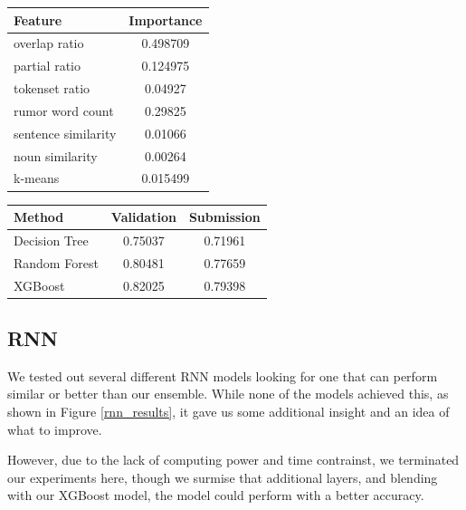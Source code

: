 \documentclass[a4paper, 12pt]{article}
\begin{document}
\begin{multicols}{2}
            \begin{center}
                \begin{tabular}{l|c}
                    Feature & Importance\\
                    \hline
                    overlap ratio & 0.498709 \\
                    partial ratio & 0.124975 \\
                    tokenset ratio & 0.04927 \\
                    rumor word count & 0.29825 \\
                    sentence similarity & 0.01066 \\
                    noun similarity & 0.00264 \\
                    k-means & 0.015499
                \end{tabular}
                \label{importance}
            \end{center}

            \begin{center}
                \begin{tabular}{l|cc}
                    Method & Validation & Submission\\
                    \hline
                    Decision Tree & 0.75037 & 0.71961 \\
                    Random Forest & 0.80481 & 0.77659 \\
                    XGBoost & 0.82025 & 0.79398 \\
                \end{tabular}
                \label{ensemb_results}
            \end{center}

        \subsection{RNN}
            We tested out several different RNN models looking for one that can perform similar or better than our ensemble. While none of the models achieved this, as shown in Figure \ref{rnn_results}, it gave us some additional insight and an idea of what to improve. 
            
            However, due to the lack of computing power and time contrainst, we terminated our experiments here, though we surmise that additional layers, and blending with our XGBoost model, the model could perform with a better accuracy.


\end{multicols}
\end{document}
